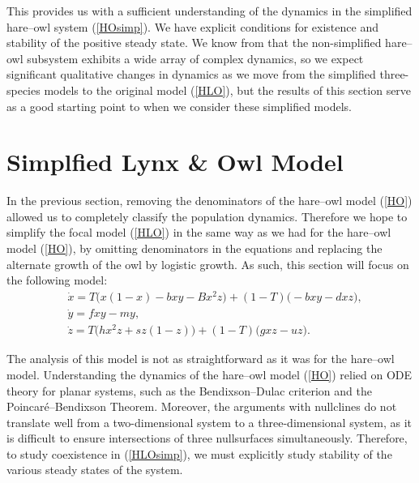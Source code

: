 \documentclass[12pt]{UOthesis}
\theoremstyle{remarkstyle}
\begin{document}
This provides us with a sufficient understanding of the dynamics in the simplified hare--owl system (\ref{HOsimp}). We have explicit conditions for existence and stability of the positive steady state. We know from \cite{TysonLutscher} that the non-simplified hare--owl subsystem exhibits a wide array of complex dynamics, so we expect significant qualitative changes in dynamics as we move from the simplified three-species models to the original model (\ref{HLO}), but the results of this section serve as a good starting point to when we consider these simplified models.


\section{Simplfied Lynx \& Owl Model}
\label{SectionSimpLO}

In the previous section, removing the denominators of the hare--owl model  (\ref{HO}) allowed us to completely classify the population dynamics. Therefore we hope to simplify the focal model (\ref{HLO}) in the same way as we had for the hare--owl model (\ref{HO}), by omitting denominators in the equations and replacing the alternate growth of the owl by logistic growth. As such, this section will focus on the following model:
\begin{equation}
	\begin{split}
		&\dot{x}=T\Big(x(1-x)-b xy-B x^2z\Big)+(1-T)\Big(-b xy-d xz\Big),\\
		&\dot{y}=fxy-my,\\
		&\dot{z}=T\Big(hx^2z+sz(1-z)\Big)+(1-T)\Big(gxz-uz\Big).
	\end{split}
	\label{HLOsimp}
\end{equation}

The analysis of this model is not as straightforward as it was for the hare--owl model. Understanding the dynamics of the hare--owl model (\ref{HO}) relied on ODE theory for planar systems, such as the Bendixson--Dulac criterion and the Poincar\'e--Bendixson Theorem. Moreover, the arguments with nullclines do not translate well from a two-dimensional system to a three-dimensional system, as it is difficult to ensure intersections of three nullsurfaces simultaneously. Therefore, to study coexistence in (\ref{HLOsimp}), we must explicitly study stability of the various steady states of the system.\\
\end{document}
